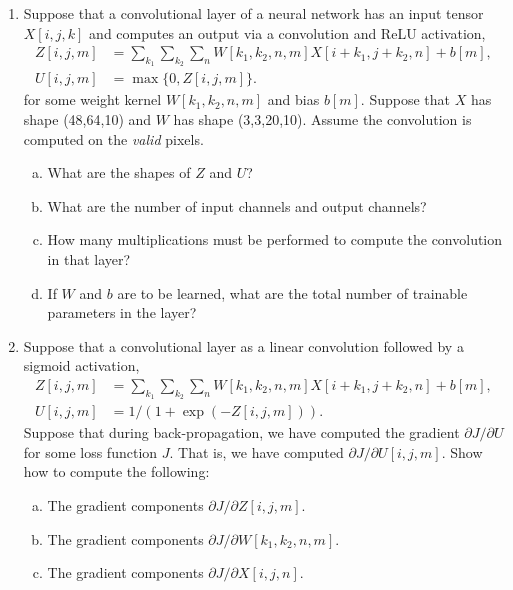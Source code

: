 \documentclass[11pt]{article}
\begin{document}
\begin{enumerate}
\item Suppose that a convolutional layer of a neural network has an input tensor $X[i,j,k]$ and computes
an output via a convolution and ReLU activation, 
\begin{align*}
    Z[i,j,m] &= \sum_{k_1} \sum_{k_2} \sum_n W[k_1,k_2,n,m]X[i+k_1,j+k_2,n] + b[m], \\
    U[i,j,m] &= \max\{0, Z[i,j,m] \}.
\end{align*}
for some weight kernel $W[k_1,k_2,n,m]$ and bias $b[m]$.  Suppose that $X$ has shape (48,64,10) and $W$ has shape (3,3,20,10).
Assume the convolution is computed on the \emph{valid} pixels.
\begin{enumerate}[(a)]
\item What are the shapes of $Z$ and $U$?
\item What are the number of input channels and output channels?
\item How many multiplications must be performed to compute the convolution in that layer?
\item If $W$ and $b$ are to be learned, what are the total number of trainable parameters in the layer?
\end{enumerate}

\item Suppose that a convolutional layer as a linear convolution followed by a sigmoid activation,
\begin{align*}
    Z[i,j,m] &= \sum_{k_1} \sum_{k_2} \sum_n W[k_1,k_2,n,m]X[i+k_1,j+k_2,n] + b[m], \\
    U[i,j,m] &= 1/(1+\exp(-Z[i,j,m])).
\end{align*}
Suppose that during back-propagation, we have computed the gradient $\partial J/\partial U$ for some loss function $J$.
That is, we have computed  $\partial J/\partial U[i,j,m]$.  Show how to compute the following:
\begin{enumerate}[(a)]
\item The gradient components $\partial J/\partial Z[i,j,m]$.
\item The gradient components $\partial J/\partial W[k_1,k_2,n,m]$.
\item The gradient components $\partial J/\partial X[i,j,n]$. 
\end{enumerate}

\end{enumerate}
\end{document}
